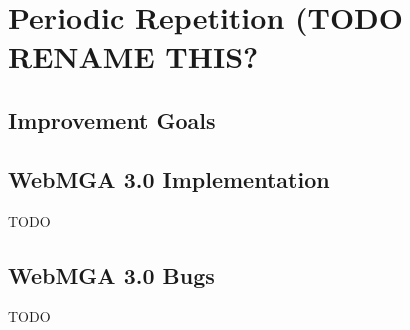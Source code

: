 \section{Periodic Repetition (TODO RENAME THIS?}
\subsection{Improvement Goals}

\subsection{WebMGA 3.0 Implementation}
TODO

\subsection{WebMGA 3.0 Bugs}
TODO
